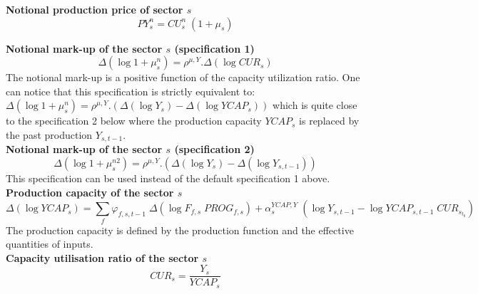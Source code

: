 \documentclass[12pt]{article}
\numberwithin{equation}{section}
\begin{document}
\noindent \textbf{Notional production price of sector $s$} 
\begin{dmath}
PY^{n}_{s} = CU^{n}_{s} \; \left( 1 + \mu_{s} \right)
\label{prices.mdlPY_n[s]}
\end{dmath}

\noindent \textbf{Notional mark-up of the sector $s$ (specification 1)} 
\begin{dmath}
\varDelta \left(\operatorname{log} 1 + \mu^{n}_{s}\right) = \rho^{\mu,Y} . \varDelta \left(\operatorname{log} CUR_{s}\right)
\label{prices.mdlMARKUP_n[s]}
\end{dmath}
The notional mark-up is a positive function of the capacity utilization ratio. One can notice that this specification is strictly equivalent to: $\varDelta \left(\operatorname{log} 1 + \mu^{n}_{s}\right) = \rho^{\mu,Y} . \left( \varDelta \left(\operatorname{log} Y_{s}\right) - \varDelta \left(\operatorname{log} YCAP_{s}\right) \right)$ which is quite close to the specification 2 below where the production capacity $YCAP_{s}$ is replaced by the past production $Y_{s, t-1}$. \\






\noindent \textbf{Notional mark-up of the sector $s$ (specification 2)} 
\begin{dmath}
\varDelta \left(\operatorname{log} 1 + \mu^{n2}_{s}\right) = \rho^{\mu,Y} . \left( \varDelta \left(\operatorname{log} Y_{s}\right) - \varDelta \left(\operatorname{log} Y_{s, t-1}\right) \right)
\label{prices.mdlMARKUP_n2[s]}
\end{dmath}
This specification can be used instead of the default specification 1 above. \\

\noindent \textbf{Production capacity of the sector $s$} 
\begin{dmath}
\varDelta \left(\operatorname{log} YCAP_{s}\right) = \sum_{f} \varphi_{f, s, t-1} \; \varDelta \left(\operatorname{log} F_{f, s} \; PROG_{f, s}\right) + \alpha^{YCAP,Y}_{s} \; \left( \operatorname{log} Y_{s, t-1} - \operatorname{log} YCAP_{s, t-1} \; CUR_{s}_{t_0} \right)
\label{prices.mdlYCAP[s]}
\end{dmath}
The production capacity is defined by the production function and the effective quantities of inputs. \\

\noindent \textbf{Capacity utilisation ratio of the sector $s$} 
\begin{dmath}
CUR_{s} = \frac{Y_{s}}{YCAP_{s}}
\label{prices.mdlCUR[s]}
\end{dmath}
\end{document}
